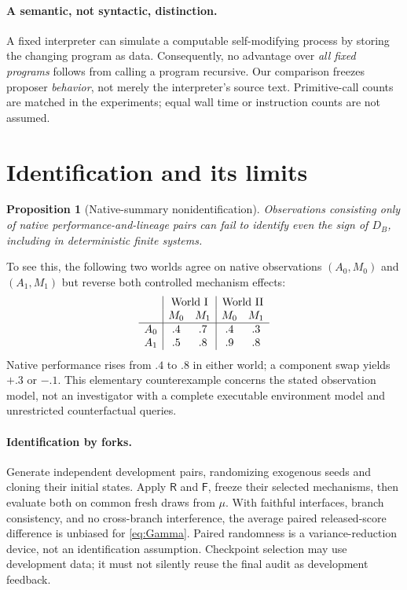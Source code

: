 \documentclass{article}
\newtheorem{proposition}[theorem]{Proposition}
\theoremstyle{definition}
\newcommand{\authorR}{\mathsf R}
\newcommand{\authorF}{\mathsf F}
\begin{document}
\paragraph{A semantic, not syntactic, distinction.}
A fixed interpreter can simulate a computable self-modifying process by storing the changing program as data. Consequently, no advantage over \emph{all fixed programs} follows from calling a program recursive. Our comparison freezes proposer \emph{behavior}, not merely the interpreter's source text. Primitive-call counts are matched in the experiments; equal wall time or instruction counts are not assumed.

\section{Identification and its limits}\label{sec:identification}
\begin{proposition}[Native-summary nonidentification]\label{prop:nonid}
Observations consisting only of native performance-and-lineage pairs can fail to identify even the sign of $D_B$, including in deterministic finite systems.
\end{proposition}
To see this, the following two worlds agree on native observations $(A_0,M_0)$ and $(A_1,M_1)$ but reverse both controlled mechanism effects:
\begin{equation}
\begin{array}{c|cc|cc}
 &\multicolumn{2}{c|}{\text{World I}}&\multicolumn{2}{c}{\text{World II}}\\
 &M_0&M_1&M_0&M_1\\\hline
 A_0&.4&.7&.4&.3\\
 A_1&.5&.8&.9&.8
\end{array}\label{eq:worlds}
\end{equation}
Native performance rises from $.4$ to $.8$ in either world; a component swap yields $+.3$ or $-.1$. This elementary counterexample concerns the stated observation model, not an investigator with a complete executable environment model and unrestricted counterfactual queries.

\paragraph{Identification by forks.}
Generate independent development pairs, randomizing exogenous seeds and cloning their initial states. Apply $\authorR$ and $\authorF$, freeze their selected mechanisms, then evaluate both on common fresh draws from $\mu$. With faithful interfaces, branch consistency, and no cross-branch interference, the average paired released-score difference is unbiased for \eqref{eq:Gamma}. Paired randomness is a variance-reduction device, not an identification assumption. Checkpoint selection may use development data; it must not silently reuse the final audit as development feedback.
\end{document}
